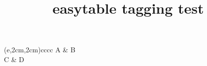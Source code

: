 \documentclass{article}
\title{easytable tagging test}
\begin{document}
\begin{TAB}(e,2cm,2cm){cc}{cc}
A & B \\
C & D
\end{TAB}
\end{document}
